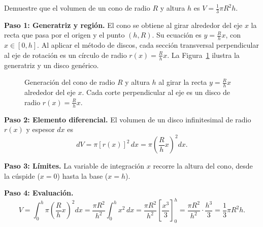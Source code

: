 \begin{example}
Demuestre que el volumen de un cono de radio $R$ y altura $h$ es
$V=\frac{1}{3}\pi R^2 h$.

\begin{myproof}
\textbf{Paso 1: Generatriz y región.}
El cono se obtiene al girar alrededor del eje $x$ la recta que pasa por el origen y el punto $(h,R)$.
Su ecuación es $y=\frac{R}{h}x$, con $x\in[0,h]$. Al aplicar el método de discos, cada sección transversal
perpendicular al eje de rotación es un círculo de radio $r(x)=\frac{R}{h}x$.
La Figura~\ref{fig:cono_discos} ilustra la generatriz y un disco genérico.

\begin{figure}[H]
\centering
\caption{Generación del cono de radio $R$ y altura $h$ al girar la recta $y=\frac{R}{h}x$ alrededor del eje $x$. Cada corte perpendicular al eje es un disco de radio $r(x)=\frac{R}{h}x$.}
\label{fig:cono_discos}
\end{figure}

\textbf{Paso 2: Elemento diferencial.}
El volumen de un disco infinitesimal de radio $r(x)$ y espesor $dx$ es
\[ dV = \pi [r(x)]^2\,dx = \pi\left(\frac{R}{h}x\right)^2 dx. \]

\textbf{Paso 3: Límites.}
La variable de integración $x$ recorre la altura del cono, desde la cúspide ($x=0$) hasta la base ($x=h$).

\textbf{Paso 4: Evaluación.}
\[
  V = \int_0^h \pi\left(\frac{R}{h}x\right)^2 dx
    = \frac{\pi R^2}{h^2}\int_0^h x^2\,dx
    = \frac{\pi R^2}{h^2}\left[\frac{x^3}{3}\right]_0^h
    = \frac{\pi R^2}{h^2}\cdot\frac{h^3}{3}
    = \boxed{\frac{1}{3}\pi R^2 h}.
\]
\end{myproof}
\end{example}

